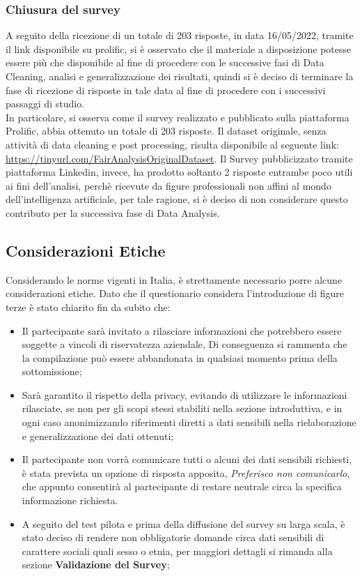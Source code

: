     \subsubsection{Chiusura del survey}
    A seguito della ricezione di un totale di 203 risposte, in data 16/05/2022, tramite il link disponibile su prolific, si è osservato che il materiale a disposizione potesse essere più che disponibile al fine di procedere con le successive fasi di Data Cleaning, analisi e generalizzazione dei risultati, quindi si è deciso di terminare la fase di ricezione di risposte in tale data al fine di procedere con i successivi passaggi di studio.\\
    In particolare, si osserva come il survey realizzato e pubblicato sulla piattaforma Prolific, abbia ottenuto un totale di 203 risposte. Il dataset originale, senza attività di data cleaning e post processing, risulta disponibile al seguente link: \url{https://tinyurl.com/FairAnalysisOriginalDataset}. Il Survey pubblicizzato tramite piattaforma Linkedin, invece, ha prodotto soltanto 2 risposte entrambe poco utili ai fini dell'analisi, perchè ricevute da figure professionali non affini al mondo dell'intelligenza artificiale, per tale ragione, si è deciso di non considerare questo contributo per la successiva fase di Data Analysis.
    
    \subsection{Considerazioni Etiche}
    
    Considerando le norme vigenti in Italia, è strettamente necessario porre alcune considerazioni etiche.
    Dato che il questionario considera l'introduzione di figure terze è stato chiarito fin da subito che:
    \begin{itemize}
        \item  Il partecipante sarà invitato a rilasciare informazioni che potrebbero essere soggette a vincoli di riservatezza aziendale, Di conseguenza si rammenta che la compilazione può essere abbandonata in qualsiasi momento prima della sottomissione;
        \item Sarà garantito il rispetto della privacy, evitando di utilizzare le informazioni rilasciate, se non per gli scopi stessi stabiliti nella sezione introduttiva, e in ogni caso anonimizzando  riferimenti diretti a dati sensibili nella rielaborazione e generalizzazione dei dati ottenuti;
        \item Il partecipante non vorrà comunicare tutti o alcuni dei dati sensibili richiesti, è stata prevista un opzione di risposta apposita, \emph{Preferisco non comunicarlo}, che appunto consentirà al partecipante di restare neutrale circa la specifica informazione richiesta.
        \item A seguito del test pilota e prima della diffusione del survey su larga scala, è stato deciso di rendere non obbligatorie domande circa dati sensibili di carattere sociali quali sesso o etnia, per maggiori dettagli si rimanda alla sezione \textbf{Validazione del Survey};
    \end{itemize}
    
